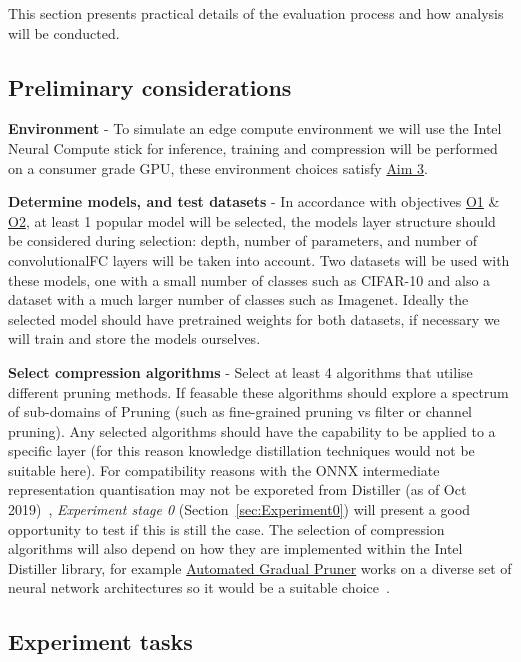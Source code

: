 \documentclass[../D1.tex]{subfiles}
\begin{document}
This section presents practical details of the evaluation process and how analysis will be conducted. 

\subsection{Preliminary considerations}
\textbf{Environment} - To simulate an edge compute environment we will use the Intel Neural Compute stick for inference, training and compression will be performed on a consumer grade GPU, these environment choices satisfy \hyperref[Aim3]{Aim 3}.

\textbf{Determine models, and test datasets} - In accordance with objectives \hyperref[obj:ModelSel]{O1} \& \hyperref[obj:DataSel]{O2}, at least 1 popular model will be selected, the models layer structure should be considered during selection: depth, number of parameters, and number of convolutional\/FC layers will be taken into account. 
Two datasets will be used with these models, one with a small number of classes such as CIFAR-10 and also a dataset with a much larger number of classes such as Imagenet. Ideally the selected model should have pretrained weights for both datasets, if necessary we will train and store the models ourselves.

\textbf{Select compression algorithms} - Select at least 4 algorithms that utilise different pruning methods. If feasable these algorithms should explore a spectrum of sub-domains of Pruning (such as fine-grained pruning vs filter or channel pruning). Any selected algorithms should have the capability to be applied to a specific layer (for this reason knowledge distillation techniques would not be suitable here).
For compatibility reasons with the ONNX intermediate representation quantisation may not be exporeted from Distiller (as of Oct 2019)~\autocite{zmoraNeuralNetworkDistiller2019}, \emph{Experiment stage 0} (Section~\ref{sec:Experiment0}) will present a good opportunity to test if this is still the case.
The selection of compression algorithms will also depend on how they are implemented within the Intel Distiller library, for example \href{https://github.com/IntelLabs/distiller/blob/master/distiller/pruning/automated_gradual_pruner.py}{Automated Gradual Pruner} works on a diverse set of neural network architectures so it would be a suitable choice~\autocite{zhuPruneNotPrune2017}.

\newpage
\subsection{Experiment tasks}\label{sec:ExperimentTasks}
\end{document}

